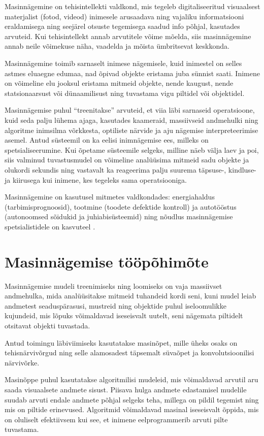 
Masinnägemine on tehisintellekti valdkond, mis tegeleb digitaliseeritud visuaalsest materjalist (fotod, videod) inimesele arusaadava ning vajaliku informatsiooni eraldamisega ning seejärel otsuste tegemisega saadud info põhjal, kasutades arvuteid. Kui tehisintellekt annab arvutitele võime mõelda, siis masinnägemine annab neile võimekuse näha, vaadelda ja mõista ümbritsevat keskkonda.

Masinnägemine toimib sarnaselt inimese nägemisele, kuid inimestel on selles astmes eluaegne edumaa, nad õpivad objekte eristama juba sünnist saati. Inimene on võimeline elu jooksul eristama mitmeid objekte, nende kaugust, nende statsionaarsust või dünaamilisust ning tuvastama vigu piltidel või objektidel.

Masinnägemise puhul ``treenitakse'' arvuteid, et viia läbi sarnaseid operatsioone, kuid seda palju lühema ajaga, kasutades kaameraid, massiivseid andmehulki ning algoritme inimsilma võrkkesta, optiliste närvide ja aju nägemise interpreteerimise asemel. Antud süsteemil on ka eelisi inimnägemise ees, milleks on spetsialiseerumine. Kui õpetame süsteemile selgeks, milline näeb välja laev ja poi, siis valminud tuvastusmudel on võimeline analüüsima mitmeid sadu objekte ja olukordi sekundis ning vastavalt ka reageerima palju suurema täpsuse-, kindluse- ja kiirusega kui inimene, kes tegeleks sama operatsiooniga.

Masinnägemine on kasutusel mitmetes valdkondades: energiahaldus (tarbimisprognoosid), tootmine (toodete defektide kontroll) ja autotööstus (autonoomsed sõidukid ja juhiabisüsteemid) ning nõudlus masinnägemise spetsialistidele on kasvuteel \cite{ref14}.

\section{Masinnägemise tööpõhimõte}\label{masinnuxe4gemise-tuxf6uxf6puxf5himuxf5te}

Masinnägemise mudeli treenimiseks ning loomiseks on vaja massiivset andmehulka, mida analüüsitakse mitmeid tuhandeid kordi seni, kuni mudel leiab andmetest seaduspärasusi, mustreid ning objektide puhul iseloomulikke kujundeid, mis lõpuks võimaldavad iseseisvalt uutelt, seni nägemata piltidelt otsitavat objekti tuvastada.

Antud toimingu läbiviimiseks kasutatakse masinõpet, mille üheks osaks on tehisnärvivõrgud ning selle alamosadest täpsemalt süvaõpet ja konvolutsioonilisi närvivõrke.

Masinõppe puhul kasutatakse algoritmilisi mudeleid, mis võimaldavad arvutil aru saada visuaalsete andmete sisust. Piisava hulga andmete edastamisel mudelile suudab arvuti endale andmete põhjal selgeks teha, millega on pildil tegemist ning mis on piltide erinevused. Algoritmid võimaldavad masinal iseseisvalt õppida, mis on oluliselt efektiivsem kui see, et inimene eelprogrammerib arvuti pilte tuvastama.

